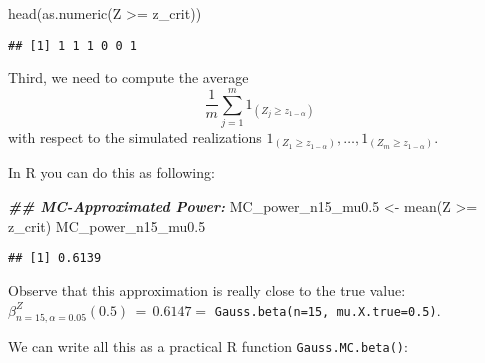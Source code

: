 \documentclass[
]{book}
\newenvironment{Shaded}{\begin{snugshade}}{\end{snugshade}}
\newcommand{\DocumentationTok}[1]{\textcolor[rgb]{0.56,0.35,0.01}{\textbf{\textit{#1}}}}
\newcommand{\FloatTok}[1]{\textcolor[rgb]{0.00,0.00,0.81}{#1}}
\newcommand{\FunctionTok}[1]{\textcolor[rgb]{0.00,0.00,0.00}{#1}}
\newcommand{\NormalTok}[1]{#1}
\newcommand{\OtherTok}[1]{\textcolor[rgb]{0.56,0.35,0.01}{#1}}
\newcommand{\SpecialCharTok}[1]{\textcolor[rgb]{0.00,0.00,0.00}{#1}}
\begin{document}
\begin{Shaded}
\begin{Highlighting}[]
\FunctionTok{head}\NormalTok{(}\FunctionTok{as.numeric}\NormalTok{(Z }\SpecialCharTok{\textgreater{}=}\NormalTok{ z\_crit))}
\end{Highlighting}
\end{Shaded}

\begin{verbatim}
## [1] 1 1 1 0 0 1
\end{verbatim}

Third, we need to compute the average
\[
\frac{1}{m}\sum_{j=1}^m 1_{(Z_j \geq z_{1-\alpha})}
\]
with respect to the simulated realizations \(1_{(Z_1 \geq z_{1-\alpha})},\dots,1_{(Z_m \geq z_{1-\alpha})}\).

In R you can do this as following:

\begin{Shaded}
\begin{Highlighting}[]
\DocumentationTok{\#\# MC{-}Approximated Power:}
\NormalTok{MC\_power\_n15\_mu0}\FloatTok{.5} \OtherTok{\textless{}{-}} \FunctionTok{mean}\NormalTok{(Z }\SpecialCharTok{\textgreater{}=}\NormalTok{ z\_crit)}
\NormalTok{MC\_power\_n15\_mu0}\FloatTok{.5}
\end{Highlighting}
\end{Shaded}

\begin{verbatim}
## [1] 0.6139
\end{verbatim}

Observe that this approximation is really close to the true value:
~
\(\beta^{Z}_{n=15,\alpha=0.05}(0.5)\,=\,0.6147 =\) \texttt{Gauss.beta(n=15,\ mu.X.true=0.5)}.

\hfill\break

We can write all this as a practical R function \texttt{Gauss.MC.beta()}:
\end{document}
